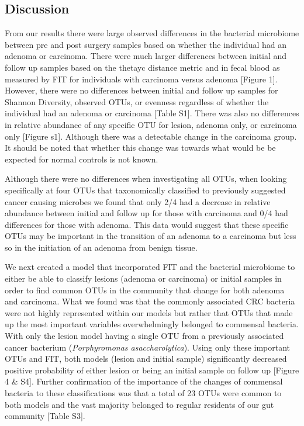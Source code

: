 \documentclass[12pt,]{article}
\begin{document}
\newpage

\subsection{Discussion}\label{discussion}

From our results there were large observed differences in the bacterial
microbiome between pre and post surgery samples based on whether the
individual had an adenoma or carcinoma. There were much larger
differences between initial and follow up samples based on the thetayc
distance metric and in fecal blood as measured by FIT for individuals
with carcinoma versus adenoma {[}Figure 1{]}. However, there were no
differences between initial and follow up samples for Shannon Diversity,
observed OTUs, or evenness regardless of whether the individual had an
adenoma or carcinoma {[}Table S1{]}. There was also no differences in
relative abundance of any specific OTU for lesion, adenoma only, or
carcinoma only {[}Figure s1{]}. Although there was a detectable change
in the carcinoma group. It should be noted that whether this change was
towards what would be be expected for normal controls is not known.

Although there were no differences when investigating all OTUs, when
looking specifically at four OTUs that taxonomically classified to
previously suggested cancer causing microbes we found that only 2/4 had
a decrease in relative abundance between initial and follow up for those
with carcinoma and 0/4 had differences for those with adenoma. This data
would suggest that these specific OTUs may be important in the
transition of an adenoma to a carcinoma but less so in the initiation of
an adenoma from benign tissue.

We next created a model that incorporated FIT and the bacterial
microbiome to either be able to classify lesions (adenoma or carcinoma)
or initial samples in order to find common OTUs in the community that
change for both adenoma and carcinoma. What we found was that the
commonly associated CRC bacteria were not highly represented within our
models but rather that OTUs that made up the most important variables
overwhelmingly belonged to commensal bacteria. With only the lesion
model having a single OTU from a previously associated cancer bacterium
(\emph{Porphyromonas asaccharolytica}). Using only these important OTUs
and FIT, both models (lesion and initial sample) significantly decreased
positive probability of either lesion or being an initial sample on
follow up {[}Figure 4 \& S4{]}. Further confirmation of the importance
of the changes of commensal bacteria to these classifications was that a
total of 23 OTUs were common to both models and the vast majority
belonged to regular residents of our gut community {[}Table S3{]}.
\end{document}
